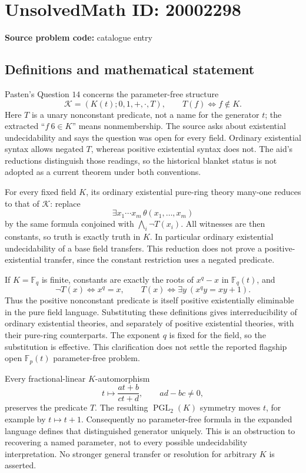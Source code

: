 \documentclass[11pt]{article}
\newcommand{\F}{\mathbb{F}}
\begin{document}
\section*{UnsolvedMath ID: 20002298}
\textbf{Source problem code:} catalogue entry
\subsection{Definitions and mathematical statement}
Pasten's Question \(14\) concerns the parameter-free structure
\[
 \mathcal K=(K(t);0,1,+,\cdot,T),\qquad
 T(f)\Longleftrightarrow f\notin K.
\]
Here \(T\) is a unary nonconstant predicate, not a name for the generator \(t\); the extracted ``\(f\ 6\in K\)'' means nonmembership. The source asks about existential undecidability and says the question was open for every field. Ordinary existential syntax allows negated \(T\), whereas positive existential syntax does not. The aid's reductions distinguish those readings, so the historical blanket status is not adopted as a current theorem under both conventions.

For every fixed field \(K\), its ordinary existential pure-ring theory many-one reduces to that of \(\mathcal K\): replace
\[
 \exists x_1\cdots x_m\,\theta(x_1,\ldots,x_m)
\]
by the same formula conjoined with \(\bigwedge_i\neg T(x_i)\). All witnesses are then constants, so truth is exactly truth in \(K\). In particular ordinary existential undecidability of a base field transfers. This reduction does not prove a positive-existential transfer, since the constant restriction uses a negated predicate.

If \(K=\F_q\) is finite, constants are exactly the roots of \(x^q-x\) in \(\F_q(t)\), and
\[
 \neg T(x)\Longleftrightarrow x^q=x,\qquad
 T(x)\Longleftrightarrow\exists y\ (x^q y=xy+1).
\]
Thus the positive nonconstant predicate is itself positive existentially eliminable in the pure field language. Substituting these definitions gives interreducibility of ordinary existential theories, and separately of positive existential theories, with their pure-ring counterparts. The exponent \(q\) is fixed for the field, so the substitution is effective. This clarification does not settle the reported flagship open \(\F_p(t)\) parameter-free problem.

Every fractional-linear \(K\)-automorphism
\[
 t\longmapsto\frac{at+b}{ct+d},\qquad ad-bc\ne0,
\]
preserves the predicate \(T\). The resulting \(\operatorname{PGL}_2(K)\) symmetry moves \(t\), for example by \(t\mapsto t+1\). Consequently no parameter-free formula in the expanded language defines that distinguished generator uniquely. This is an obstruction to recovering a named parameter, not to every possible undecidability interpretation. No stronger general transfer or resolution for arbitrary \(K\) is asserted.
\end{document}
